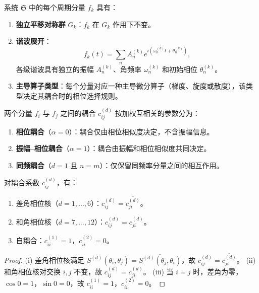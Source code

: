\begin{definition}[子周期分量]\label{def:sub-periodic-structure}
系统 $\mathfrak{S}$ 中的每个周期分量 $f_k$ 具有：
\begin{enumerate}[label=(\roman*)]
    \item \textbf{独立平移对称群} $G_k$：$f_k$ 在 $G_k$ 作用下不变。
    \item \textbf{谐波展开}：
    \[
    f_k(t)=\sum_n A_n^{(k)}e^{i(\omega_n^{(k)}t+\theta_n^{(k)})},
    \]
    各级谐波具有独立的振幅 $A_n^{(k)}$、角频率 $\omega_n^{(k)}$ 和初始相位 $\theta_n^{(k)}$。
    \item \textbf{主导算子类型}：每个分量对应一种主导微分算子（梯度、旋度或散度），该类型决定其耦合时的相位选择规则。
\end{enumerate}
\end{definition}

\begin{definition}[耦合类型]\label{def:coupling-types}
两个分量 $f_i$ 与 $f_j$ 之间的耦合 $c_{ij}^{(d)}$ 按加权互相关的参数分为：
\begin{enumerate}[label=(\roman*)]
    \item \textbf{相位耦合}（$\alpha=0$）：耦合仅由相位相似度决定，不含振幅信息。
    \item \textbf{振幅--相位耦合}（$\alpha=1$）：耦合由振幅和相位相似度共同决定。
    \item \textbf{同频耦合}（$d=1$ 且 $n=m$）：仅保留同频率分量之间的相互作用。
\end{enumerate}
\end{definition}

\begin{proposition}[耦合系数的对称性]\label{prop:coupling-symmetry}
对耦合系数 $c_{ij}^{(d)}$，有：
\begin{enumerate}[label=(\roman*)]
    \item 差角相位核（$d=1,\dots,6$）：$c_{ij}^{(d)}=\overline{c_{ji}^{(d)}}$。
    \item 和角相位核（$d=7,\dots,12$）：$c_{ij}^{(d)}=c_{ji}^{(d)}$。
    \item 自耦合：$c_{ii}^{(1)}=1$，$c_{ii}^{(2)}=0$。
\end{enumerate}
\end{proposition}

\begin{proof}
(i) 差角相位核满足 $S^{(d)}(\theta_i,\theta_j)=\overline{S^{(d)}(\theta_j,\theta_i)}$，故 $c_{ij}^{(d)}=\overline{c_{ji}^{(d)}}$。
(ii) 和角相位核对交换 $i,j$ 不变，故 $c_{ij}^{(d)}=c_{ji}^{(d)}$。
(iii) 当 $i=j$ 时，差角为零，$\cos 0=1$，$\sin 0=0$，故 $c_{ii}^{(1)}=1$，$c_{ii}^{(2)}=0$。
\end{proof}

